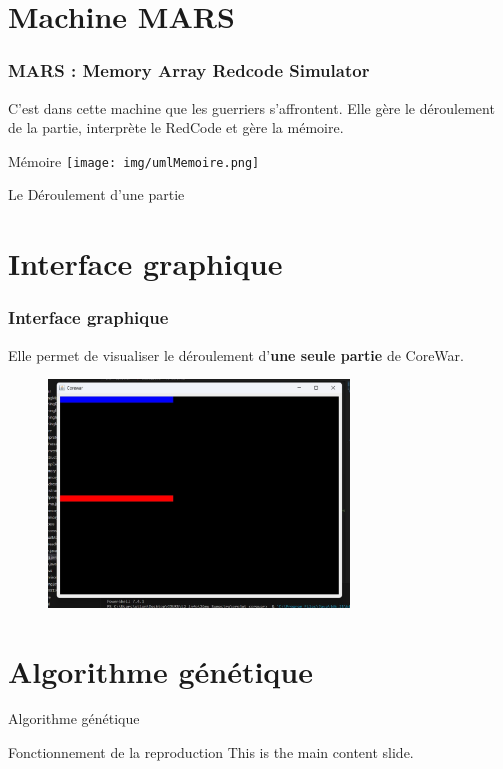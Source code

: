 \documentclass{beamer}
\begin{document}
\section{Machine MARS}
\begin{frame}
    \frametitle{MARS : Memory Array Redcode Simulator}
    C'est dans cette machine que les guerriers s'affrontent. Elle gère le déroulement de la partie, interprète le RedCode et gère la mémoire.
\end{frame}

\begin{frame}{Mémoire}
    \texttt{[image: img/umlMemoire.png]}
\end{frame}

\begin{frame}{Le Déroulement d'une partie}
    
\end{frame}

\section{Interface graphique}
\begin{frame}
    \frametitle{Interface graphique}
    Elle permet de visualiser le déroulement d'\textbf{une seule partie} de CoreWar.
    \begin{figure}
        \centering
        \includegraphics[width = 8cm]{img/display.jpg}
    \end{figure}
\end{frame}

\section{Algorithme génétique}
\begin{frame}{Algorithme génétique}
    
\end{frame}

\begin{frame}{Fonctionnement de la reproduction}
    This is the main content slide.
\end{frame}
\end{document}
